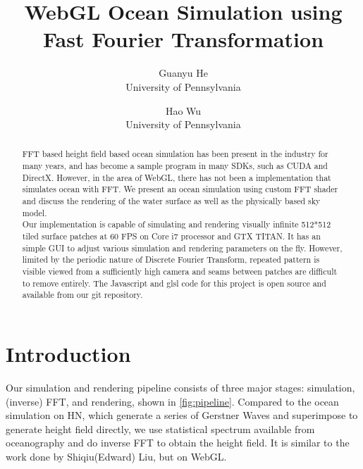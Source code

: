 \documentclass{jcgt}
\begin{document}
\title{WebGL Ocean Simulation using Fast Fourier Transformation}

\author
       {Guanyu He\\University of Pennsylvania
        \and Hao Wu\\University of Pennsylvania
       }



\maketitle
\thispagestyle{firstpagestyle}

\begin{abstract}
FFT based height field based ocean simulation has been present in the industry for many years, and has become a sample program in many SDKs, such as CUDA and DirectX. However, in the area of WebGL,  there has not been a implementation that simulates ocean with FFT. We present an ocean simulation using custom FFT shader and discuss the rendering of the water surface as well as the physically based sky model.\\

Our implementation is capable of simulating and rendering visually infinite 512*512 tiled surface patches at 60 FPS on Core i7 processor and GTX TITAN. It has an simple GUI to adjust various simulation and rendering parameters on the fly. However, limited by the periodic nature of Discrete Fourier Transform, repeated pattern is visible viewed from a sufficiently high camera and seams between patches are difficult to remove entirely.
The Javascript and glsl code for this project is open source and available from our git repository.

\end{abstract}


\section{Introduction}
\label{sec:introduction}
Our simulation and rendering pipeline consists of three major stages: simulation, (inverse) FFT, and rendering, shown in \ref{fig:pipeline}. Compared to the ocean simulation on HN, which generate a series of Gerstner Waves and superimpose to generate height field directly, we use statistical spectrum available from oceanography and do inverse FFT to obtain the height field. It is similar to the work done by Shiqiu(Edward) Liu, but on WebGL.
\end{document}
